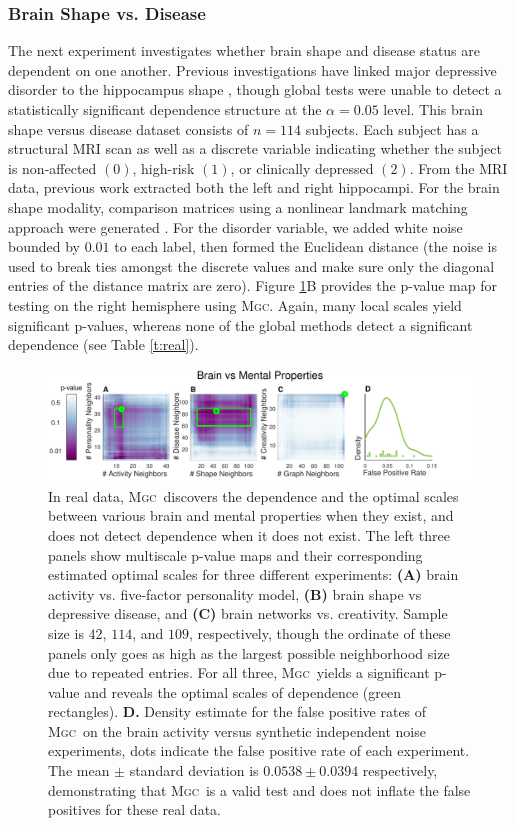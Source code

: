 \documentclass[11pt]{article}
\providecommand{\sct}[1]{{\normalfont\textsc{#1}}}
\newcommand{\Mgc}{\sct{Mgc}}
\begin{document}
\subsubsection*{Brain Shape vs. Disease} 


The next experiment investigates whether brain shape and disease status are dependent on one another.  Previous investigations have linked major depressive disorder to the hippocampus shape \cite{ParkEtAl2008,PosenerEtAl2003}, though global tests were unable to detect a statistically significant dependence structure at the $\alpha=0.05$ level.
This brain shape versus disease dataset consists of $n=114$ subjects. Each subject has a structural MRI scan as well as a discrete variable indicating whether the subject is non-affected $(0)$, high-risk $(1)$, or clinically depressed $(2)$.  From the MRI data, previous work extracted both the left and right hippocampi. For the brain shape modality, comparison matrices using a nonlinear landmark matching approach were generated \cite{ParkEtAl2008,BegEtAl2005}. For the disorder variable, we added white noise bounded by $0.01$ to each label, then formed the Euclidean distance (the noise is used to break ties amongst the discrete values and make sure only the diagonal entries of the distance matrix are zero).
% 
Figure \ref{f:real}{\color{magenta}B} provides the p-value map for testing on the right hemisphere using \Mgc. Again, many local scales yield significant p-values, whereas none of the global methods detect a significant dependence  (see Table \ref{t:real}). 

\begin{figure}[htbp]
\includegraphics[width=1.0\textwidth,trim={0 0 1.5cm 0},clip]{Figures/FigReal}
\caption{In real data, \Mgc~discovers the dependence and the optimal scales between various brain and mental properties when they exist, and does not detect dependence when it does not exist.  The left three panels show multiscale p-value maps and their corresponding estimated optimal scales for three different experiments: \textbf{(A)}  brain activity vs. five-factor personality model, \textbf{(B)}  brain shape vs depressive disease, and \textbf{(C)} brain networks vs. creativity. Sample size is $42$, $114$, and $109$, respectively, though the ordinate of these panels only goes as high as the largest possible neighborhood size due to repeated entries.  
For all three, \Mgc~yields a significant p-value and reveals the optimal scales of dependence (green rectangles).
\textbf{D.} Density estimate for the false positive rates of  \Mgc~on the brain activity versus synthetic independent noise experiments, dots indicate the false positive rate of each experiment. The mean $\pm$ standard deviation is $0.0538 \pm 0.0394$ respectively, demonstrating that \Mgc~is a valid test and does not inflate the false positives for these real data.}
\label{f:real}
\end{figure}
\end{document}
